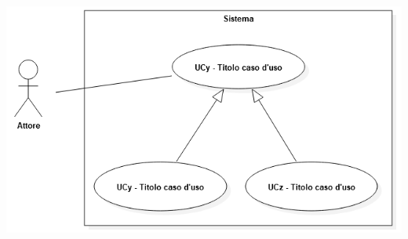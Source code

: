 \begin{itemize}
\begin{itemize}
		            \begin{center}
			            \includegraphics*[width=15cm]{../../../images/norme_di_progetto/generalizzazioneCasiDiUso.png}
		            \end{center}
	      \end{itemize}
\end{itemize}

